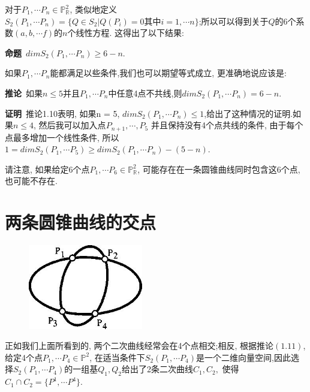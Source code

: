 \documentclass[UTF8]{book}
\begin{document}
		
		对于$P_{1},\cdots P_{n}\in \mathbb{P}^{2}_{\mathbb{R}}$, 类似地定义$S_{2}(P_{1},\cdots P_{n})=\{Q\in S_{2}|Q(P_{i})=0 \text{其中} i=1,\cdots n\}$;所以可以得到关于$ Q $的6个系数$(a,b,\cdots f)$的$ n $个线性方程. 这得出了以下结果:
		
		
		\textbf{命题}\ $dimS_{2}(P_{1},\cdots P_{n})\geq6-n$.
		
		
		如果$P_{1},\cdots P_{n}$能都满足以些条件,我们也可以期望等式成立, 更准确地说应该是:
		
		
		\textbf{推论}\ 如果$n\leq5$并且$P_{1},\cdots P_{n}$中任意4点不共线,则$dimS_{2}(P_{1},\cdots P_{n})=6-n$.
		
		
		\textbf{证明}\ 推论1.10表明, 如果n = 5, $dim S_{2}(P_{1},\cdots P_{n})\leq1$,给出了这种情况的证明.如果$n\leq4$, 然后我可以加入点$P_{n+1},\cdots,P_{5}$ 并且保持没有4个点共线的条件, 由于每个点最多增加一个线性条件, 所以$1=dimS_{2}(P_{1},\cdots P_{5})\geq dimS_{2}(P_{1},\cdots P_{n})-(5-n)$.
		
		
		请注意, 如果给定6个点$P_{1},\cdots P_{6} \in \mathbb{P}^{2}_{\mathbb{R}}$, 可能存在在一条圆锥曲线同时包含这6个点, 也可能不存在.
		
	\section{两条圆锥曲线的交点}
		\begin{figure}[H]
		  \centering
		  \includegraphics[width=5cm]{20.jpg}\\
		\end{figure}
		正如我们上面所看到的, 两个二次曲线经常会在4个点相交;相反, 根据推论$ (1.11) $, 给定4个点$P_{1},\cdots P_{4}\in \mathbb{P}^{2}$, 在适当条件下$S_{2}(P_{1},\cdots P_{4})$是一个二维向量空间,因此选择$S_{2}(P_{1},\cdots P_{4})$的一组基$Q_{1},Q_{2}$给出了2条二次曲线$C_{1},C_{2},$ 使得$C_{1}\cap C_{2}=\{P^{1},\cdots P^{4}\}$.
		
\end{document}
